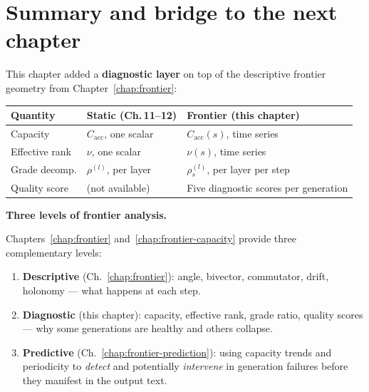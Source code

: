 \documentclass[11pt, twoside, openright]{memoir}
\numberwithin{equation}{chapter}
\begin{document}
\section{Summary and bridge to the next chapter}
\label{sec:cap-summary}

This chapter added a \textbf{diagnostic layer} on top of the
descriptive frontier geometry from Chapter~\ref{chap:frontier}:

\begin{center}
\renewcommand{\arraystretch}{1.4}\small
\begin{tabular}{@{}L{3.2cm} L{4.5cm} L{4.5cm}@{}}
\toprule
\textbf{Quantity} & \textbf{Static (Ch.\,11--12)} &
  \textbf{Frontier (this chapter)} \\
\midrule
Capacity &
  $C_{\mathrm{acc}}$, one scalar &
  $C_{\mathrm{acc}}(s)$, time series \\
Effective rank &
  $\nu$, one scalar &
  $\nu(s)$, time series \\
Grade decomp. &
  $\rho^{(l)}$, per layer &
  $\rho^{(l)}_s$, per layer per step \\
Quality score &
  (not available) &
  Five diagnostic scores per generation \\
\bottomrule
\end{tabular}
\end{center}

\begin{keyidea}
\textbf{Three levels of frontier analysis.}

Chapters~\ref{chap:frontier} and~\ref{chap:frontier-capacity}
provide three complementary levels:

\begin{enumerate}[nosep]
\item \textbf{Descriptive} (Ch.~\ref{chap:frontier}):
  angle, bivector, commutator, drift, holonomy --- what happens at
  each step.
\item \textbf{Diagnostic} (this chapter):
  capacity, effective rank, grade ratio, quality scores --- why
  some generations are healthy and others collapse.
\item \textbf{Predictive} (Ch.~\ref{chap:frontier-prediction}):
  using capacity trends and periodicity to \emph{detect} and
  potentially \emph{intervene} in generation failures before they
  manifest in the output text.
\end{enumerate}
\end{keyidea}
\end{document}
